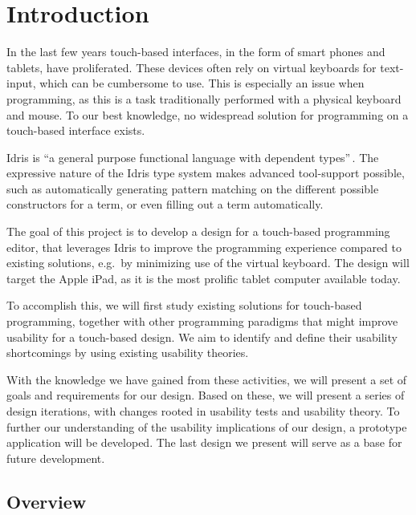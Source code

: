 \chapter{Introduction}
\label{sec:Introduction}
In the last few years touch-based interfaces, in the form of smart phones and tablets, have proliferated. These devices often rely on virtual keyboards for text-input, which can be cumbersome to use.
This is especially an issue when programming, as this is a task traditionally performed with a physical keyboard and mouse.
To our best knowledge, no widespread solution for programming on a touch-based interface exists.

Idris is ``a general purpose functional language with dependent types''\,\cite{brady2013idris}. The expressive nature of the Idris type system makes advanced tool-support possible, such as automatically generating pattern matching on the different possible constructors for a term, or even filling out a term automatically.

The goal of this project is to develop a design for a touch-based programming editor, that leverages Idris to improve the programming experience compared to existing solutions, e.g.\ by minimizing use of the virtual keyboard.
The design will target the Apple iPad, as it is the most prolific tablet computer available today.

To accomplish this, we will first study existing solutions for touch-based programming, together with other programming paradigms that might improve usability for a touch-based design.
We aim to identify and define their usability shortcomings by using existing usability theories.

With the knowledge we have gained from these activities, we will present a set of goals and requirements for our design.
Based on these, we will present a series of design iterations, with changes rooted in usability tests and usability theory.
To further our understanding of the usability implications of our design, a prototype application will be developed.
The last design we present will serve as a base for future development.

\section{Overview}
